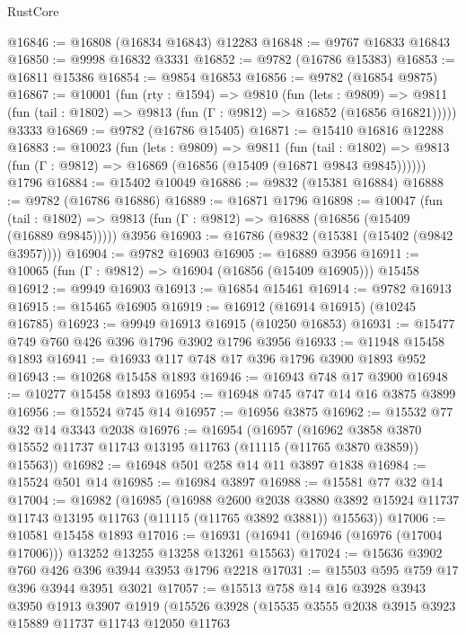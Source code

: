 \begin{lexlean}{RustCore}
\begin{coremodule}
@16846 := @16808 (@16834 @16843) @12283
@16848 := @9767 @16833 @16843
@16850 := @9998 @16832 @3331
@16852 := @9782 (@16786 @15383)
@16853 := @16811 @15386
@16854 := @9854 @16853
@16856 := @9782 (@16854 @9875)
@16867 := @10001
    (fun (rty : @1594) =>
    @9810
      (fun (lets : @9809) =>
      @9811 (fun (tail : @1802) => @9813 (fun (Γ : @9812) => @16852 (@16856 @16821)))))
    @3333
@16869 := @9782 (@16786 @15405)
@16871 := @15410 @16816 @12288
@16883 := @10023
    (fun (lets : @9809) =>
    @9811
      (fun (tail : @1802) =>
      @9813 (fun (Γ : @9812) => @16869 (@16856 (@15409 (@16871 @9843 @9845))))))
    @1796
@16884 := @15402 @10049
@16886 := @9832 (@15381 @16884)
@16888 := @9782 (@16786 @16886)
@16889 := @16871 @1796
@16898 := @10047
    (fun (tail : @1802) => @9813 (fun (Γ : @9812) => @16888 (@16856 (@15409 (@16889 @9845)))))
    @3956
@16903 := @16786 (@9832 (@15381 (@15402 (@9842 @3957))))
@16904 := @9782 @16903
@16905 := @16889 @3956
@16911 := @10065 (fun (Γ : @9812) => @16904 (@16856 (@15409 @16905))) @15458
@16912 := @9949 @16903
@16913 := @16854 @15461
@16914 := @9782 @16913
@16915 := @15465 @16905
@16919 := @16912 (@16914 @16915) (@10245 @16785)
@16923 := @9949 @16913 @16915 (@10250 @16853)
@16931 := @15477 @749 @760 @426 @396 @1796 @3902 @1796 @3956
@16933 := @11948 @15458 @1893
@16941 := @16933 @117 @748 @17 @396 @1796 @3900 @1893 @952
@16943 := @10268 @15458 @1893
@16946 := @16943 @748 @17 @3900
@16948 := @10277 @15458 @1893
@16954 := @16948 @745 @747 @14 @16 @3875 @3899
@16956 := @15524 @745 @14
@16957 := @16956 @3875
@16962 := @15532 @77 @32 @14 @3343 @2038
@16976 := @16954
    (@16957
      (@16962 @3858 @3870 @15552 @11737 @11743 @13195 @11763 (@11115 (@11765 @3870 @3859)) @15563))
@16982 := @16948 @501 @258 @14 @11 @3897 @1838
@16984 := @15524 @501 @14
@16985 := @16984 @3897
@16988 := @15581 @77 @32 @14
@17004 := @16982
    (@16985
      (@16988
        @2600
        @2038
        @3880
        @3892
        @15924
        @11737
        @11743
        @13195
        @11763
        (@11115 (@11765 @3892 @3881))
        @15563))
@17006 := @10581 @15458 @1893
@17016 := @16931 (@16941 (@16946 (@16976 (@17004 @17006))) @13252 @13255 @13258 @13261 @15563)
@17024 := @15636 @3902 @760 @426 @396 @3944 @3953 @1796 @2218
@17031 := @15503 @595 @759 @17 @396 @3944 @3951 @3021
@17057 := @15513
    @758
    @14
    @16
    @3928
    @3943
    @3950
    @1913
    @3907
    @1919
    (@15526
      @3928
      (@15535
        @3555
        @2038
        @3915
        @3923
        @15889
        @11737
        @11743
        @12050
        @11763

\end{coremodule}
\end{lexlean}
